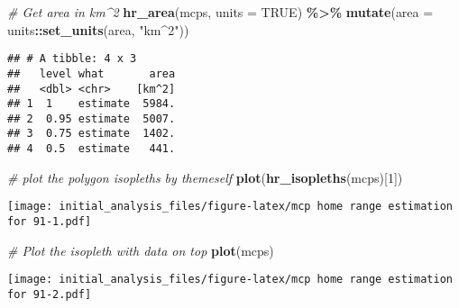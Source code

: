 \documentclass[
]{article}
\newenvironment{Shaded}{\begin{snugshade}}{\end{snugshade}}
\newcommand{\AttributeTok}[1]{\textcolor[rgb]{0.13,0.29,0.53}{#1}}
\newcommand{\CommentTok}[1]{\textcolor[rgb]{0.56,0.35,0.01}{\textit{#1}}}
\newcommand{\ConstantTok}[1]{\textcolor[rgb]{0.56,0.35,0.01}{#1}}
\newcommand{\DecValTok}[1]{\textcolor[rgb]{0.00,0.00,0.81}{#1}}
\newcommand{\FunctionTok}[1]{\textcolor[rgb]{0.13,0.29,0.53}{\textbf{#1}}}
\newcommand{\NormalTok}[1]{#1}
\newcommand{\SpecialCharTok}[1]{\textcolor[rgb]{0.81,0.36,0.00}{\textbf{#1}}}
\newcommand{\StringTok}[1]{\textcolor[rgb]{0.31,0.60,0.02}{#1}}
\begin{document}
\begin{Shaded}
\begin{Highlighting}[]
\CommentTok{\# Get area in km\^{}2}
\FunctionTok{hr\_area}\NormalTok{(mcps, }\AttributeTok{units =} \ConstantTok{TRUE}\NormalTok{) }\SpecialCharTok{\%\textgreater{}\%} 
  \FunctionTok{mutate}\NormalTok{(}\AttributeTok{area =}\NormalTok{ units}\SpecialCharTok{::}\FunctionTok{set\_units}\NormalTok{(area, }\StringTok{"km\^{}2"}\NormalTok{))}
\end{Highlighting}
\end{Shaded}

\begin{verbatim}
## # A tibble: 4 x 3
##   level what       area
##   <dbl> <chr>    [km^2]
## 1  1    estimate  5984.
## 2  0.95 estimate  5007.
## 3  0.75 estimate  1402.
## 4  0.5  estimate   441.
\end{verbatim}

\begin{Shaded}
\begin{Highlighting}[]
\CommentTok{\# plot the polygon isopleths by themeself}
\FunctionTok{plot}\NormalTok{(}\FunctionTok{hr\_isopleths}\NormalTok{(mcps)[}\DecValTok{1}\NormalTok{])}
\end{Highlighting}
\end{Shaded}

\texttt{[image: initial\_analysis\_files/figure-latex/mcp home range estimation for 91-1.pdf]}

\begin{Shaded}
\begin{Highlighting}[]
\CommentTok{\# Plot the isopleth with data on top}
\FunctionTok{plot}\NormalTok{(mcps) }
\end{Highlighting}
\end{Shaded}

\texttt{[image: initial\_analysis\_files/figure-latex/mcp home range estimation for 91-2.pdf]}
\end{document}
